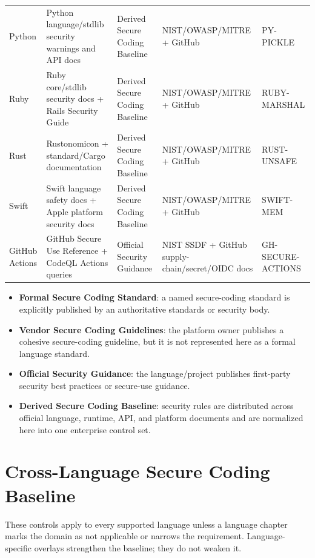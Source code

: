 \documentclass[10pt,letterpaper]{article}
\begin{document}
\begin{landscape}
\begin{longtable}{@{}P{0.8in}P{2.05in}P{1.45in}P{3.25in}P{0.7in}@{}}
Python & Python language/stdlib security warnings and API docs & Derived Secure Coding Baseline & NIST/OWASP/MITRE + GitHub & PY-PICKLE\\
Ruby & Ruby core/stdlib security docs + Rails Security Guide & Derived Secure Coding Baseline & NIST/OWASP/MITRE + GitHub & RUBY-MARSHAL\\
Rust & Rustonomicon + standard/Cargo documentation & Derived Secure Coding Baseline & NIST/OWASP/MITRE + GitHub & RUST-UNSAFE\\
Swift & Swift language safety docs + Apple platform security docs & Derived Secure Coding Baseline & NIST/OWASP/MITRE + GitHub & SWIFT-MEM\\
GitHub Actions & GitHub Secure Use Reference + CodeQL Actions queries & Official Security Guidance & NIST SSDF + GitHub supply-chain/secret/OIDC docs & GH-SECURE-ACTIONS\\
\bottomrule
\end{longtable}
\end{landscape}
\normalsize

\begin{itemize}[leftmargin=*,itemsep=2pt]
  \item \textbf{Formal Secure Coding Standard}: a named secure-coding standard is explicitly published by an authoritative standards or security body.
  \item \textbf{Vendor Secure Coding Guidelines}: the platform owner publishes a cohesive secure-coding guideline, but it is not represented here as a formal language standard.
  \item \textbf{Official Security Guidance}: the language/project publishes first-party security best practices or secure-use guidance.
  \item \textbf{Derived Secure Coding Baseline}: security rules are distributed across official language, runtime, API, and platform documents and are normalized here into one enterprise control set.
\end{itemize}
\clearpage
\section{Cross-Language Secure Coding Baseline}
These controls apply to every supported language unless a language chapter marks the domain as not applicable or narrows the requirement. Language-specific overlays strengthen the baseline; they do not weaken it.
\end{document}
